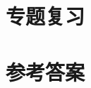 \documentclass[UTF8]{ctexart}
\begin{document}
\section*{专题复习}


\begin{enumerate}
\foreachproblem[leibiyimo]{\newpage\item\label{prob:\thisproblemlabel}\thisproblem}
\end{enumerate}

\begin{enumerate}
\foreachproblem[leibiermo]{\newpage\item\label{prob:\thisproblemlabel}\thisproblem}
\end{enumerate}


\begin{enumerate}
\foreachproblem[leibizhongkao]{\newpage\item\label{prob:\thisproblemlabel}\thisproblem}
\end{enumerate}

\begin{enumerate}
\foreachproblem[leibi]{\newpage\item\label{prob:\thisproblemlabel}\thisproblem}
\end{enumerate}


\newpage
\showanswers
\section*{参考答案}
\begin{itemize}
\end{itemize}
\end{document}
